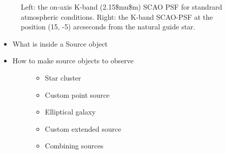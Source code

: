 \begin{figure}
\noindent{}\label{fig-scopesim-templates-cluster-example}

\caption{Left: the on-axis K-band (2.15\$mu\$m) SCAO PSF for standrard atmospheric conditions.
Right: the K-band SCAO-PSF at the position (15, -5) arcseconds from the natural guide star.}
\end{figure}

\begin{itemize}
\item What is inside a Source object

\item 
\begin{description}
\item[{How to make source objects to observe}] \leavevmode 
\begin{itemize}
\item Star cluster

\item Custom point source

\item Elliptical galaxy

\item Custom extended source

\item Combining sources
\end{itemize}

\end{description}
\end{itemize}
